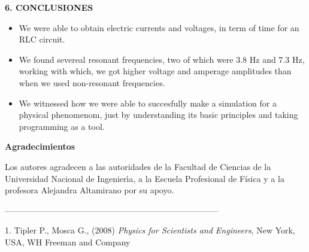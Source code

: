 \documentclass[10pt,a4paper]{article}
\begin{document}
\begin{multicols}{2}
\begin{center}
{\large \bf 6. CONCLUSIONES}
\end{center}
\begin{itemize}
\item We were able to obtain electric currents and voltages, in term of time for an RLC circuit. 
\item We found severeal resonant frequencies, two of which were 3.8 Hz and 7.3 Hz, working with which, we got higher voltage and amperage amplitudes than when we used non-resonant frequencies.
\item We witnessed how we were able to succesfully make a simulation for a physical phenomenom, just by understanding its basic principles and taking programming as a tool.
\end{itemize}


\begin{center}
{\large \bf Agradecimientos}
\end{center}
Los autores agradecen a las autoridades de la Facultad de Ciencias de la Universidad Nacional de Ingenier\'{\i}a, a la Escuela Profesional de Física y a la profesora Alejandra Altamirano por su apoyo.

\end{multicols}

\begin{center}
 -----------------------------------------------------------------------------
\end{center}
\begin{multicols}{2}
\begin{list}{}{\setlength{\topsep}{0mm}\setlength{\itemsep}{0mm}%
\setlength{\parsep}{0mm}\setlength{\leftmargin}{4mm}}
%
\small
\item[1.] Tipler P., Mosca G., (2008) \textit{Physics for Scientists and Engineers}, New York, USA, WH Freeman and Company
%
\end{list}
\end{multicols}
\end{document}
